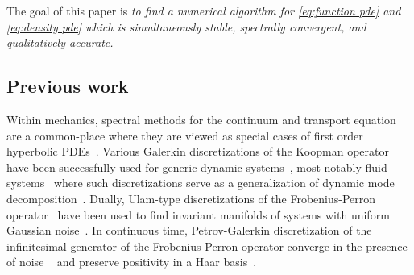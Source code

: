 \documentclass[final,leqno]{siamart}
\begin{document}
The goal of this paper is
\emph{to find a numerical algorithm for \eqref{eq:function pde} and \eqref{eq:density pde} which is simultaneously stable, spectrally convergent, and qualitatively accurate.}

\subsection{Previous work}
Within mechanics, spectral methods for the continuum and transport equation are a common-place where they are viewed as special cases of first order hyperbolic PDEs~\cite{Gottlieb2001}.
Various Galerkin discretizations of the Koopman operator have been successfully used for generic dynamic systems~\cite{BudisicMohrMezic2012,Mezic2005}, most notably fluid systems~\cite{Rowley2009} where such discretizations serve as a generalization of dynamic mode decomposition~\cite{Schmid2010}.
Dually, Ulam-type discretizations of the Frobenius-Perron operator~\cite{LasotaMackey1994,Ulam1947} have been used to find invariant manifolds of systems with uniform Gaussian noise~\cite{FroylandJungeKoltai2013,FroylandPadberg2009}.
In continuous time, Petrov-Galerkin discretization of the infinitesimal generator of the Frobenius Perron operator converge in the presence of noise ~\cite{BittracherKoltaiJunge2015} and preserve positivity in a Haar basis~\cite{koltai2011thesis}.
\end{document}
